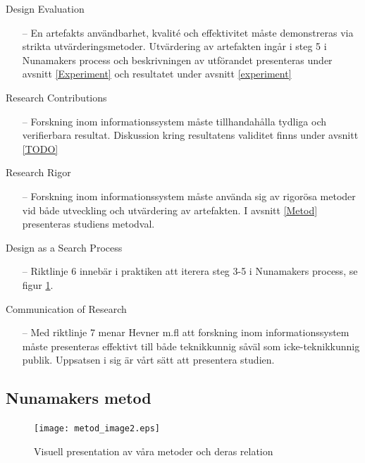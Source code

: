 \documentclass[a4paper,11pt]{article}
\begin{document}
{\begin{description}
    Design Evaluation
     \begin{itemize}
    \item [--] En artefakts användbarhet, kvalité och effektivitet måste demonstreras via strikta utvärderingsmetoder. Utvärdering av artefakten ingår i steg 5 i Nunamakers process och beskrivningen av utförandet presenteras under avsnitt \ref{Experiment} och resultatet under avsnitt \ref{experiment} 
    \end{itemize}
    \item [Riktlinje 4]
    Research Contributions
     \begin{itemize}
    \item [--] Forskning inom informationssystem måste tillhandahålla tydliga och verifierbara resultat. Diskussion kring resultatens validitet finns under avsnitt \ref{TODO}
    \end{itemize}
    \item [Riktlinje 5]
    Research Rigor
     \begin{itemize}
    \item [--] Forskning inom informationssystem måste använda sig av rigorösa metoder vid både utveckling och utvärdering av artefakten. I avsnitt \ref{Metod} presenteras studiens metodval.
    \end{itemize}
    \item [Riktlinje 6]
    Design as a Search Process
     \begin{itemize}
    \item [--] Riktlinje 6 innebär i praktiken att iterera steg 3-5 i Nunamakers process, se figur \ref{fig:metod_visual}. 
    \end{itemize}
    \item [Riktlinje 7]
    Communication of Research
     \begin{itemize}
    \item [--] Med riktlinje 7 menar Hevner m.fl att forskning inom informationssystem måste presenteras effektivt till både teknikkunnig såväl som icke-teknikkunnig publik. Uppsatsen i sig är vårt sätt att presentera studien. 
    \end{itemize}
\end{description}

\subsection{Nunamakers metod}\label{Nunamakers metod}

\begin{figure}[ht!]
\centering
\texttt{[image: metod\_image2.eps]}
\caption{Visuell presentation av våra metoder och deras relation}
\label{fig:metod_visual}
\end{figure}

}
\end{document}
